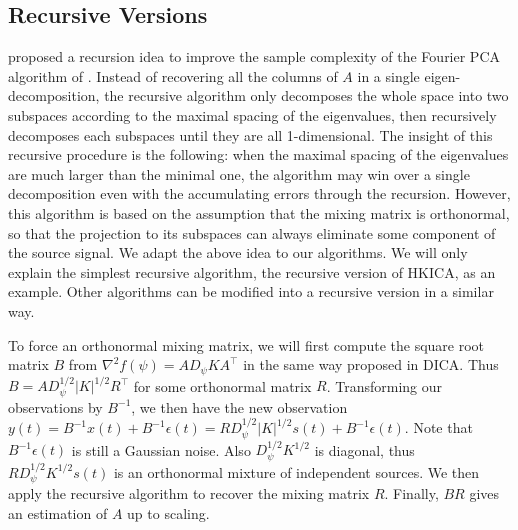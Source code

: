 \documentclass[11pt]{article}
\newcommand{\eps}{\epsilon}
\begin{document}
\subsection{Recursive Versions}
\label{subsec:recurICA}
\citet{vempala2014max} proposed a recursion idea to improve the sample complexity of the Fourier PCA algorithm of \citet{goyal2014fourier}. 
Instead of recovering all the columns of $A$ in a single eigen-decomposition, the recursive algorithm only decomposes the whole space into two subspaces according to the maximal spacing of the eigenvalues, 
then recursively decomposes each subspaces until they are all 1-dimensional.
The insight of this recursive procedure is the following: when the maximal spacing of the eigenvalues are much larger than the minimal one, the algorithm may win over a single decomposition even with the accumulating errors through the recursion.
However, this algorithm is based on the assumption that the mixing matrix is orthonormal, so that the projection to its subspaces can always eliminate some component of the source signal. 
We adapt the above idea to our algorithms. We will only explain the simplest recursive algorithm, the recursive version of HKICA, as an example. Other algorithms can be modified into a recursive version in a similar way.

To force an orthonormal mixing matrix, we will first compute the square root matrix $B$ from $\nabla^2f(\psi) = AD_{\psi}KA^{\top}$ in the same way proposed in DICA. 
Thus $B = AD_{\psi}^{1/2}|K|^{1/2}R^{\top}$ for some orthonormal matrix $R$. 
Transforming our observations by $B^{-1}$, we then have the new observation $y(t) = B^{-1}x(t) + B^{-1}\eps(t) = RD_{\psi}^{1/2}|K|^{1/2}s(t) + B^{-1}\eps(t)$. 
Note that $B^{-1}\eps(t)$ is still a Gaussian noise. Also $D_{\psi}^{1/2}K^{1/2}$ is diagonal, thus $RD_{\psi}^{1/2}K^{1/2}s(t)$ is an orthonormal mixture of independent sources.
We then apply the recursive algorithm to recover the mixing matrix $R$. Finally, $BR$ gives an estimation of $A$ up to scaling.
\end{document}
